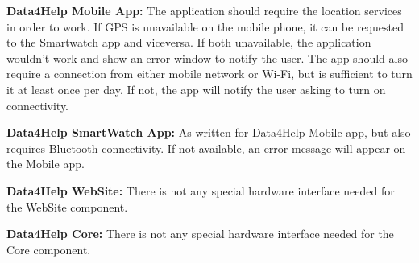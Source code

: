 \textbf{Data4Help Mobile App:} The application should require the location services in order to work. If GPS is unavailable on the mobile phone, it can be requested to the Smartwatch app and viceversa. If both unavailable, the application wouldn't work and show an error window to notify the user.
The app should also require a connection from either mobile network or Wi-Fi, but is sufficient to turn it at least once per day. If not, the app will notify the user asking to turn on connectivity. 

\textbf{Data4Help SmartWatch App:} As written for Data4Help Mobile app, but also requires Bluetooth connectivity. If not available, an error message will appear on the Mobile app.

\textbf{Data4Help WebSite:} There is not any special hardware interface needed for the WebSite component.

\textbf{Data4Help Core:} There is not any special hardware interface needed for the Core component.